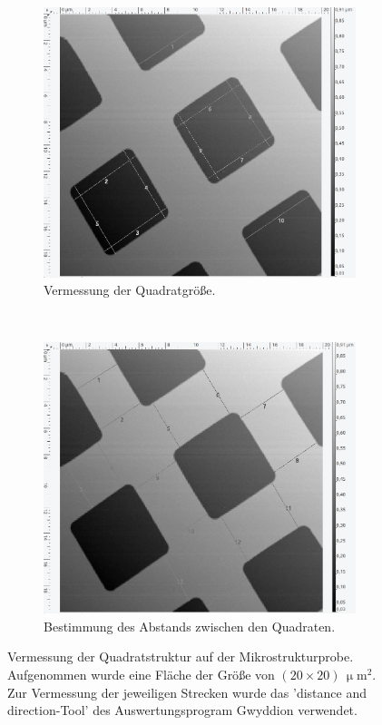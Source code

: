 \begin{figure}[H]
\centering
	\begin{subfigure}[t]{0.45\textwidth}
	\includegraphics[width=\textwidth]{AFM_auswertung/quad_durch_vor.png}
	\caption{Vermessung der Quadratgr\"o{\ss}e.}
	\label{abb:quada}
	\end{subfigure}
	~
	\begin{subfigure}[t]{0.45\textwidth}
	\includegraphics[width=\textwidth]{AFM_auswertung/quad_abb_vor.png}
	\caption{Bestimmung des Abstands zwischen den Quadraten.}
	\label{abb:quadb}
	\end{subfigure}
\caption{Vermessung der Quadratstruktur auf der Mikrostrukturprobe. Aufgenommen wurde eine Fl\"ache der Gr\"o{\ss}e von $(20 \times 20) \, \upmu \text{m}^2$. Zur Vermessung der jeweiligen Strecken wurde das 'distance and direction-Tool' des Auswertungsprogram Gwyddion verwendet.}
\label{abb:quad}
\end{figure}
